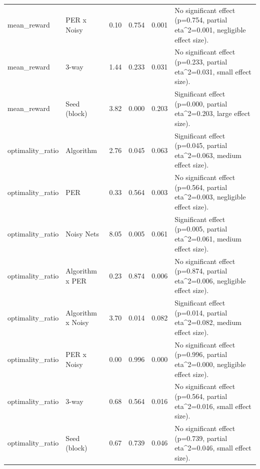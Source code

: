 \begin{tabular}{llllll}
mean\_reward & PER x Noisy & 0.10 & 0.754 & 0.001 & No significant effect (p=0.754, partial eta\textasciicircum 2=0.001, negligible effect size). \\
mean\_reward & 3-way & 1.44 & 0.233 & 0.031 & No significant effect (p=0.233, partial eta\textasciicircum 2=0.031, small effect size). \\
mean\_reward & Seed (block) & 3.82 & 0.000 & 0.203 & Significant effect (p=0.000, partial eta\textasciicircum 2=0.203, large effect size). \\
optimality\_ratio & Algorithm & 2.76 & 0.045 & 0.063 & Significant effect (p=0.045, partial eta\textasciicircum 2=0.063, medium effect size). \\
optimality\_ratio & PER & 0.33 & 0.564 & 0.003 & No significant effect (p=0.564, partial eta\textasciicircum 2=0.003, negligible effect size). \\
optimality\_ratio & Noisy Nets & 8.05 & 0.005 & 0.061 & Significant effect (p=0.005, partial eta\textasciicircum 2=0.061, medium effect size). \\
optimality\_ratio & Algorithm x PER & 0.23 & 0.874 & 0.006 & No significant effect (p=0.874, partial eta\textasciicircum 2=0.006, negligible effect size). \\
optimality\_ratio & Algorithm x Noisy & 3.70 & 0.014 & 0.082 & Significant effect (p=0.014, partial eta\textasciicircum 2=0.082, medium effect size). \\
optimality\_ratio & PER x Noisy & 0.00 & 0.996 & 0.000 & No significant effect (p=0.996, partial eta\textasciicircum 2=0.000, negligible effect size). \\
optimality\_ratio & 3-way & 0.68 & 0.564 & 0.016 & No significant effect (p=0.564, partial eta\textasciicircum 2=0.016, small effect size). \\
optimality\_ratio & Seed (block) & 0.67 & 0.739 & 0.046 & No significant effect (p=0.739, partial eta\textasciicircum 2=0.046, small effect size). \\
\bottomrule
\end{tabular}
